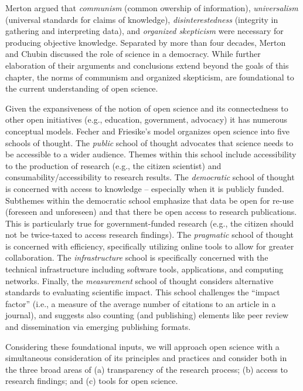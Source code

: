 \documentclass[
  11pt,
]{book}
\begin{document}
Merton \citeyearpar{merton_science_1942} argued that \emph{communism} (common owership of information), \emph{universalism} (universal standards for claims of knowledge), \emph{disinterestedness} (integrity in gathering and interpreting data), and \emph{organized skepticism} were necessary for producing objective knowledge. Separated by more than four decades, Merton and Chubin \citeyearpar{chubin_open_1985} discussed the role of science in a democracy. While further elaboration of their arguments and conclusions extend beyond the goals of this chapter, the norms of communism and organized skepticism, are foundational to the current understanding of open science.

Given the expansiveness of the notion of open science and its connectedness to other open initiatives (e.g., education, government, advocacy) it has numerous conceptual models. Fecher and Friesike's \citeyearpar{fecher_open_2013} model organizes open science into five schools of thought. The \emph{public} school of thought advocates that science needs to be accessible to a wider audience. Themes within this school include accessibility to the production of research (e.g., the citizen scientist) and consumability/accessibility to research results. The \emph{democratic} school of thought is concerned with access to knowledge -- especially when it is publicly funded. Subthemes within the democratic school emphasize that data be open for re-use (foreseen and unforeseen) and that there be open access to research publications. This is particularly true for government-funded research (e.g., the citizen should not be twice-taxed to access research findings). The \emph{pragmatic} school of thought is concerned with efficiency, specifically utilizing online tools to allow for greater collaboration. The \emph{infrastructure} school is specifically concerned with the technical infrastructure including software tools, applications, and computing networks. Finally, the \emph{measurement} school of thought considers alternative standards to evaluating scientific impact. This school challenges the ``impact factor'' (i.e., a measure of the average number of citations to an article in a journal), and suggests also counting (and publishing) elements like peer review and dissemination via emerging publishing formats.

Considering these foundational inputs, we will approach open science with a simultaneous consideration of its principles and practices and consider both in the three broad areas of (a) transparency of the research process; (b) access to research findings; and (c) tools for open science.
\end{document}
